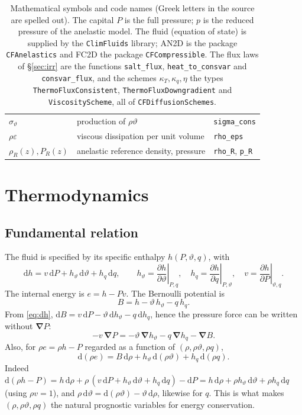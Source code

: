 \documentclass[11pt,a4paper]{article}
\newcommand{\vt}{\vartheta}                    %
\newcommand{\hth}{{h_{\vartheta}}}               %
\newcommand{\hq}{{h_q}}                          %
\newcommand{\bnabla}{\boldsymbol{\nabla}}
\newcommand{\pdc}[3]{\left.\frac{\partial #1}{\partial #2}\right|_{#3}}
\newcommand{\code}[1]{\texttt{#1}}
\begin{document}
\begin{table}[ht]
\begin{tabular}{p{4.3cm}p{6.0cm}p{4.9cm}}
$\sigma_\vt$ & production of $\rho\vt$ & \code{sigma\_cons} \\
$\rho\varepsilon$ & viscous dissipation per unit volume & \code{rho\_eps} \\
$\rho_R(z),P_R(z)$ & anelastic reference density, pressure & \code{rho\_R}, \code{p\_R} \\
\hline
\end{tabular}
\caption{Mathematical symbols and code names (Greek letters in the source are spelled out). The capital $P$ is the full pressure; $p$ is the reduced pressure of the anelastic model.
The fluid (equation of state) is supplied by the \code{ClimFluids} library; AN2D is the package \code{CFAnelastics} and FC2D the package \code{CFCompressible}. The flux laws of \S\ref{sec:irr} are the functions \code{salt\_flux}, \code{heat\_to\_consvar} and \code{consvar\_flux}, and the schemes $\kappa_T,\kappa_q,\eta$ the types \code{ThermoFluxConsistent}, \code{ThermoFluxDowngradient} and \code{ViscosityScheme}, all of \code{CFDiffusionSchemes}.}
\label{tab:symbols}
\end{table}

\section{Thermodynamics}\label{sec:thermo}
\subsection{Fundamental relation}
The fluid is specified by its specific enthalpy $h(P,\vt,q)$, with
\begin{equation}
  \mathrm{d}h = v\,\mathrm{d}P + \hth\,\mathrm{d}\vt + \hq\,\mathrm{d}q,\qquad
  \hth=\pdc{h}{\vt}{P,q},\quad \hq=\pdc{h}{q}{P,\vt},\quad v=\pdc{h}{P}{\vt,q}.
  \label{eq:dh}
\end{equation}
The internal energy is $e=h-Pv$. The Bernoulli potential is
\begin{equation}
  B = h-\vt\,\hth-q\,\hq .
  \label{eq:B}
\end{equation}
From \eqref{eq:dh}, $\mathrm{d}B = v\,\mathrm{d}P-\vt\,\mathrm{d}\hth-q\,\mathrm{d}\hq$, hence the pressure force can be
written without $\bnabla P$:
\begin{equation}
  -v\,\bnabla P = -\vt\,\bnabla\hth - q\,\bnabla\hq - \bnabla B .
  \label{eq:thermoforce}
\end{equation}
Also, for $\rho e=\rho h-P$ regarded as a function of $(\rho,\rho\vt,\rho q)$,
\begin{equation}
  \mathrm{d}(\rho e) = B\,\mathrm{d}\rho + \hth\,\mathrm{d}(\rho\vt) + \hq\,\mathrm{d}(\rho q).
  \label{eq:dpe}
\end{equation}
Indeed $\mathrm{d}(\rho h-P)=h\,\mathrm{d}\rho+\rho\,(v\,\mathrm{d}P+\hth\,\mathrm{d}\vt+\hq\,\mathrm{d}q)-\mathrm{d}P
=h\,\mathrm{d}\rho+\rho\hth\,\mathrm{d}\vt+\rho\hq\,\mathrm{d}q$ (using $\rho v=1$), and
$\rho\,\mathrm{d}\vt=\mathrm{d}(\rho\vt)-\vt\,\mathrm{d}\rho$, likewise for $q$. This is what makes $(\rho,\rho\vt,\rho q)$ the natural prognostic
variables for energy conservation.
\end{document}
